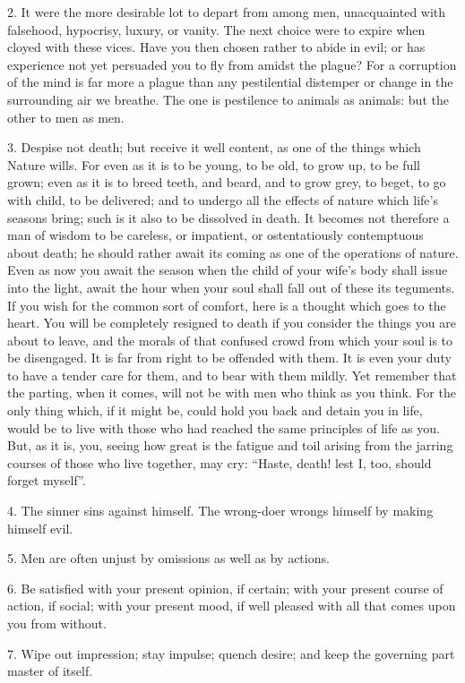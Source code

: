 \documentclass{book}
\begin{document}
2. It were the more desirable lot to depart from among men,
unacquainted with falsehood, hypocrisy, luxury, or vanity. The next
choice were to expire when cloyed with these vices. Have you then
chosen rather to abide in evil; or has experience not yet persuaded
you to fly from amidst the plague? For a corruption of the mind is far
more a plague than any pestilential distemper or change in the
surrounding air we breathe. The one is pestilence to animals as
animals: but the other to men as men.

3. Despise not death; but receive it well content, as one of the
things which Nature wills. For even as it is to be young, to be old,
to grow up, to be full grown; even as it is to breed teeth, and beard,
and to grow grey, to beget, to go with child, to be delivered; and to
undergo all the effects of nature which life's seasons bring; such is
it also to be dissolved in death. It becomes not therefore a man of
wisdom to be careless, or impatient, or ostentatiously contemptuous
about death; he should rather await its coming as one of the
operations of nature. Even as now you await the season when the child
of your wife's body shall issue into the light, await the hour when
your soul shall fall out of these its teguments. If you wish for the
common sort of comfort, here is a thought which goes to the heart. You
will be completely resigned to death if you consider the things you
are about to leave, and the morals of that confused crowd from which
your soul is to be disengaged. It is far from right to be offended
with them. It is even your duty to have a tender care for them, and to
bear with them mildly. Yet remember that the parting, when it comes,
will not be with men who think as you think. For the only thing which,
if it might be, could hold you back and detain you in life, would be
to live with those who had reached the same principles of life as
you. But, as it is, you, seeing how great is the fatigue and toil
arising from the jarring courses of those who live together, may cry:
``Haste, death!  lest I, too, should forget myself''.

4. The sinner sins against himself. The wrong-doer wrongs himself by
making himself evil.

5. Men are often unjust by omissions as well as by actions.

6. Be satisfied with your present opinion, if certain; with your
present course of action, if social; with your present mood, if well
pleased with all that comes upon you from without.

7. Wipe out impression; stay impulse; quench desire; and keep the
governing part master of itself.
\end{document}
